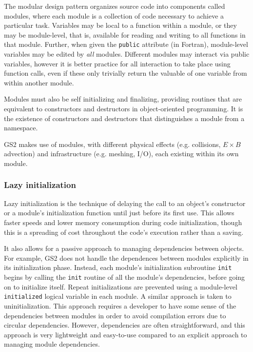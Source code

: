 The modular design pattern organizes source code into components called
modules, where each module is a collection of code necessary to achieve a
particular task.
Variables may be local to a function within a module,
or they may be module-level, that is, available for reading and writing to all
functions in that module.
Further, when given the \texttt{public} attribute (in Fortran), module-level
variables may be edited by \emph{all} modules.
Different modules may interact via public variables, however it is better practice for
all interaction to take place using function calls, even if these only trivially
return the valuable of one variable from within another module. 

Modules must also be self initializing and finalizing, providing routines that
are equivalent to constructors and destructors in object-oriented programming.
It is the existence of constructors and destructors that distinguishes a module
from a namespace.

GS2 makes use of modules, with different physical effects (e.g. collisions,
$E\times B$ advection) and infrastructure (e.g. meshing, I/O), each existing
within its own module.



\subsubsection{Lazy initialization}\label{sec:lazy_init}

Lazy initialization is the technique of delaying the call to an object's
constructor or a module's initialization function until just before its first
use.
This allows faster speeds and lower memory consumption during code
initialization, though this is a spreading of cost throughout the code's
execution rather than a saving.

It also allows for a passive approach to managing dependencies between objects.
For example, GS2 does not handle the dependences between modules explicitly in
its initialization phase.
Instead, each module's initialization subroutine \texttt{init} begins by
calling the \texttt{init} routine of all the module's dependencies, before
going on to initialize itself.
Repeat initializations are prevented using a module-level \texttt{initialized}
logical variable in each module.
A similar approach is taken to uninitialization.
This approach requires a developer to have some sense of the dependencies
between modules in order to avoid compilation errors due to circular
dependencies.
However, dependencies are often straightforward, and this approach is very
lightweight and easy-to-use compared to an explicit approach to managing module
dependencies.


